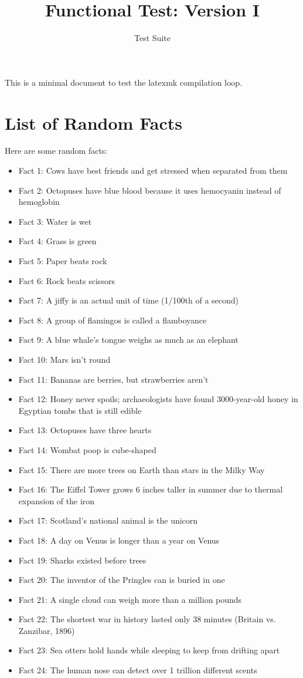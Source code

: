 \documentclass{article}
\begin{document}
\title{Functional Test: Version I}
\author{Test Suite}
\maketitle
This is a minimal document to test the latexmk compilation loop.

\section{List of Random Facts}
Here are some random facts:
\begin{itemize}
    \item Fact 1: Cows have best friends and get stressed when separated from them
    \item Fact 2: Octopuses have blue blood because it uses hemocyanin instead of hemoglobin
    \item Fact 3: Water is wet
    \item Fact 4: Grass is green
    \item Fact 5: Paper beats rock
    \item Fact 6: Rock beats scissors
    \item Fact 7: A jiffy is an actual unit of time (1/100th of a second)
    \item Fact 8: A group of flamingos is called a flamboyance
    \item Fact 9: A blue whale's tongue weighs as much as an elephant
    \item Fact 10: Mars isn't round
    \item Fact 11: Bananas are berries, but strawberries aren't
    \item Fact 12: Honey never spoils; archaeologists have found 3000-year-old honey in Egyptian tombs that is still edible
    \item Fact 13: Octopuses have three hearts
    \item Fact 14: Wombat poop is cube-shaped
    \item Fact 15: There are more trees on Earth than stars in the Milky Way
    \item Fact 16: The Eiffel Tower grows 6 inches taller in summer due to thermal expansion of the iron
    \item Fact 17: Scotland's national animal is the unicorn
    \item Fact 18: A day on Venus is longer than a year on Venus
    \item Fact 19: Sharks existed before trees
    \item Fact 20: The inventor of the Pringles can is buried in one
    \item Fact 21: A single cloud can weigh more than a million pounds
    \item Fact 22: The shortest war in history lasted only 38 minutes (Britain vs. Zanzibar, 1896)
    \item Fact 23: Sea otters hold hands while sleeping to keep from drifting apart
    \item Fact 24: The human nose can detect over 1 trillion different scents
\end{itemize}
\end{document}
